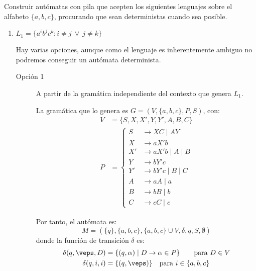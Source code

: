 \documentclass[12pt]{article}
\begin{document}
    \begin{ejercicio}[2.5 puntos]
        Construir autómatas con pila que acepten los siguientes lenguajes sobre el alfabeto $\{a, b, c\}$, procurando que sean deterministas cuando sea posible.
        \begin{enumerate}
            \item $L_1 = \{a^i b^j c^k : i \neq j ~\lor~ j \neq k\}$
            
            Hay varias opciones, aunque como el lenguaje es inherentemente ambiguo no podremos conseguir un autómata determinista.
            \begin{description}
                \item[Opción 1] A partir de la gramática independiente del contexto que genera $L_1$.
                
                La gramática que lo genera es $G=(V,\{a,b,c\},P,S)$, con:
                \begin{equation*}
                    \begin{aligned}
                        V &= \{ S, X,X',Y,Y',A,B,C \} \\
                        P &= \left\{
                            \begin{aligned}
                                S &\rightarrow XC \mid AY \\
                                X &\rightarrow aX'b\\
                                X' &\rightarrow aX'b \mid A \mid B\\
                                Y &\rightarrow bY'c\\
                                Y' &\rightarrow bY'c \mid B \mid C\\
                                A &\rightarrow aA \mid a \\
                                B &\rightarrow bB \mid b \\
                                C &\rightarrow cC \mid c
                            \end{aligned}
                        \right.
                    \end{aligned}
                \end{equation*}

                Por tanto, el autómata es:
                \begin{equation*}
                    M=(\{q\},\{a,b,c\},\{a,b,c\}\cup V,\delta,q,S,\emptyset)
                \end{equation*}
                donde la función de transición $\delta$ es:
                \begin{align*}
                    \delta(q,\veps,D) &= \{(q,\alpha)\mid D\rightarrow \alpha\in P\}\qquad \text{para } D\in V\\
                    \delta(q,i,i) &= \{(q,\veps)\} \quad \text{para } i\in \{a,b,c\}
                \end{align*}


\end{description}
\end{enumerate}
\end{ejercicio}
\end{document}
